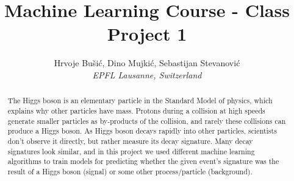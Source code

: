 \documentclass[10pt,conference,compsocconf]{IEEEtran}
\begin{document}
\title{Machine Learning Course - Class Project 1}

\author{
  Hrvoje Bušić, Dino Mujkić, Sebastijan Stevanović\\
  \textit{EPFL Lausanne, Switzerland}
}

\maketitle

\begin{abstract}
The Higgs boson is an elementary particle in the Standard Model of physics, which explains why other particles have mass. Protons during a collision at high speeds generate smaller particles as by-products of the collision, and rarely these collisions can produce a Higgs boson. As Higgs boson decays rapidly into other particles, scientists don't observe it directly, but rather measure its decay signature. Many decay signatures look similar, and in this project we used different machine learning algorithms to train models for predicting whether the given event's signature was the result of a Higgs boson (signal) or some other process/particle (background).
\end{abstract}
\end{document}
